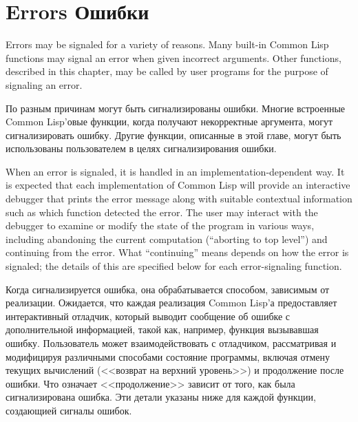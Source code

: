 
\clearpage\def\pagestatus{FINAL PROOF}

\chapter{Errors Ошибки}
\label{XERROR}

Errors may be signaled for a variety of reasons.
Many built-in Common Lisp functions may signal an error when given incorrect
arguments.  Other functions, described in this chapter,
may be called by user programs for the purpose of signaling
an error.

По разным причинам могут быть сигнализированы ошибки.
Многие встроенные Common Lisp'овые функции, когда получают некорректные
аргумента, могут сигнализировать ошибку. Другие функции, описанные в этой главе,
могут быть использованы пользователем в целях сигнализирования ошибки.

When an error is signaled, it is
handled in an implementation-dependent way.  It is expected
that each implementation of Common Lisp will provide an interactive debugger that
prints the error message along with suitable contextual information
such as which function detected the error.  The user may interact with
the debugger to examine or modify the state of the program in various
ways, including abandoning the current computation (``aborting to top
level'') and continuing from the error.  What ``continuing'' means
depends on how the error is signaled; the details of this are specified below
for each error-signaling function.

Когда сигнализируется ошибка, она обрабатывается способом, зависимым от
реализации. Ожидается, что каждая реализация Common Lisp'а предоставляет
интерактивный отладчик, который выводит сообщение об ошибке с дополнительной
информацией, такой как, например, функция вызывавшая ошибку. Пользователь может
взаимодействовать с отладчиком, рассматривая и модифицируя различными способами
состояние программы, включая отмену текущих вычислений (<<возврат на верхний
уровень>>) и продолжение после ошибки. Что означает <<продолжение>> зависит от
того, как была сигнализирована ошибка. Эти детали указаны ниже для каждой
функции, создающией сигналы ошибок.

